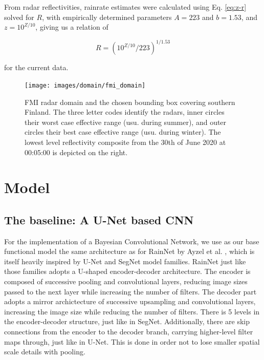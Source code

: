 



From radar reflectivities, rainrate estimates were calculated using Eq. \ref{eq:z-r} solved for $R$, with empirically determined parameters $A=223$ and $b=1.53$, and $z = 10^{Z / 10}$, giving us a relation of

\begin{equation}
\label{eq:dbz_to_r}
R = (10^{Z / 10} / 223)^{1/1.53}
\end{equation}

for the current data. 

\begin{figure}
	\label{fig:domain}
	\centering
	\texttt{[image: images/domain/fmi\_domain]}
	\caption{FMI radar domain and the chosen bounding box covering southern Finland. The three letter codes identify the radars, inner circles their worst case effective range (usu. during summer), and outer circles their best case effective range (usu. during winter). The lowest level reflectivity composite from the 30th of June 2020 at 00:05:00 is depicted on the right.}
\end{figure} 


\section{Model}

\subsection{The baseline: A U-Net based CNN}
\label{section:rainnet}

For the implementation of a Bayesian Convolutional Network, we use as our base functional model  the same architecture as for RainNet by Ayzel et al. \cite{ayzel_rainnet_nodate}, which is itself heavily inspired by U-Net and SegNet model families. RainNet just like those families adopts a U-shaped encoder-decoder architecture. The encoder is composed of successive pooling and convolutional layers, reducing image sizes passed to the next layer while increasing the number of filters. The decoder part adopts a mirror archictecture of successive upsampling and convolutional layers, increasing the image size while reducing the number of filters. There is 5 levels in the encoder-decoder structure, just like in SegNet. Additionally, there are skip connections from the encoder to the decoder branch, carrying higher-level filter maps through, just like in U-Net. This is done in order not to lose smaller spatial scale details with pooling.  

